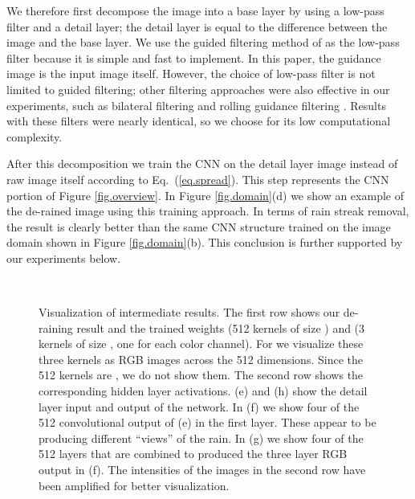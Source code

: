 \documentclass[journal]{IEEEtran}
\begin{document}
We therefore first decompose the image into a base layer by using a low-pass filter and a detail layer; the detail layer is equal to the difference between the image and the base layer. We use the guided filtering method of \cite{23} as the low-pass filter because it is simple and fast to implement. In this paper, the guidance image is the input image itself.
However, the choice of low-pass filter is not limited to guided filtering; other filtering approaches were also effective in our experiments, such as bilateral filtering \cite{24} and rolling guidance filtering \cite{25}. Results with these filters were nearly identical, so we choose \cite{23} for its low computational complexity. 

After this decomposition we train the CNN on the detail layer image instead of raw image itself according to Eq.\ (\ref{eq.spread}).
This step represents the CNN portion of Figure \ref{fig.overview}. In Figure \ref{fig.domain}(d) we show an example of the de-rained image using this training approach. In terms of rain streak removal, the result is clearly better than the same CNN structure trained on the image domain shown in Figure \ref{fig.domain}(b). This conclusion is further supported by our experiments below.

\begin{figure*}[t]
\centering
{}
\\
\caption{Visualization of intermediate results. The first row shows our de-raining result and the trained weights  (512 kernels of size ) and  (3 kernels of size , one for each color channel). For  we visualize these three kernels as RGB images across the 512 dimensions.  Since the 512 kernels  are , we do not show them. The second row shows the corresponding hidden layer activations. (e) and (h) show the detail layer input and output of the network. In (f) we show four of the 512 convolutional output of (e) in the first layer. These appear to be producing different ``views'' of the rain. In (g) we show four of the 512 layers that are combined to produced the three layer RGB output in (f).  The intensities of the images in the second row have been amplified for better visualization.} \label{fig.intermediate}
\end{figure*}
\end{document}
